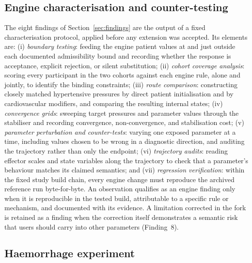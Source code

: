 \documentclass[preprint,12pt,nopreprintline]{elsarticle}
\begin{document}
\subsection{Engine characterisation and counter-testing}
\label{sec:methods-char}

The eight findings of Section~\ref{sec:findings} are the output of a fixed characterisation protocol, applied before any extension was accepted. Its elements are: (i) \emph{boundary testing}: feeding the engine patient values at and just outside each documented admissibility bound and recording whether the response is acceptance, explicit rejection, or silent substitution; (ii) \emph{cohort coverage analysis}: scoring every participant in the two cohorts against each engine rule, alone and jointly, to identify the binding constraints; (iii) \emph{route comparison}: constructing closely matched hypertensive pressures by direct patient initialisation and by cardiovascular modifiers, and comparing the resulting internal states; (iv) \emph{convergence grids}: sweeping target pressures and parameter values through the stabiliser and recording convergence, non-convergence, and stabilisation cost; (v) \emph{parameter perturbation and counter-tests}: varying one exposed parameter at a time, including values chosen to be wrong in a diagnostic direction, and auditing the trajectory rather than only the endpoint; (vi) \emph{trajectory audits}: reading effector scales and state variables along the trajectory to check that a parameter's behaviour matches its claimed semantics; and (vii) \emph{regression verification}: within the fixed study build chain, every engine change must reproduce the archived reference run byte-for-byte. An observation qualifies as an engine finding only when it is reproducible in the tested build, attributable to a specific rule or mechanism, and documented with its evidence. A limitation corrected in the fork is retained as a finding when the correction itself demonstrates a semantic risk that users should carry into other parameters (Finding~8).

\subsection{Haemorrhage experiment}
\end{document}
